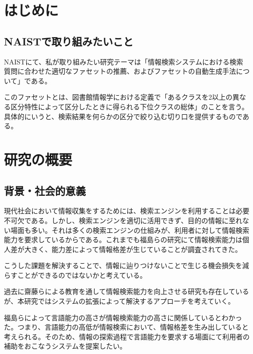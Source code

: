 \documentclass[a4j,10pt, twocolumn]{jarticle}
\begin{document}
\section{はじめに}
\subsection{NAISTで取り組みたいこと}
NAISTにて、私が取り組みたい研究テーマは「情報検索システムにおける検索質問に合わせた適切なファセットの推薦、およびファセットの自動生成手法について」である。

このファセットとは、図書館情報学における定義で「あるクラスを2以上の異なる区分特性によって区分したときに得られる下位クラスの総体\cite{libdic}」のことを言う。具体的にいうと、検索結果を何らかの区分で絞り込む切り口を提供するものである。
\section{研究の概要}
\subsection{背景・社会的意義}
 現代社会において情報収集をするためには、検索エンジンを利用することは必要不可欠である。しかし、検索エンジンを適切に活用できず、目的の情報に至れない場面も多い。それは多くの検索エンジンの仕組みが、利用者に対して情報検索能力を要求しているからである。これまでも福島らの研究にて情報検索能力は個人差が大きく、能力差によって情報格差が生じていることが調査されてきた\cite{fukushima}。

 こうした課題を解決することで、情報に辿りつけないことで生じる機会損失を減らすことができるのではないかと考えている。
 
 過去に齋藤らによる教育を通して情報検索能力を向上させる研究\cite{saito}も存在しているが、本研究ではシステムの拡張によって解決するアプローチを考えていく。

 福島らによって言語能力の高さが情報検索能力の高さに関係しているとわかった\cite{fukushima}。つまり、言語能力の高低が情報検索において、情報格差を生み出していると考えられる。そのため、情報の探索過程で言語能力を要求する場面にて利用者の補助をおこなうシステムを提案したい。
\end{document}
